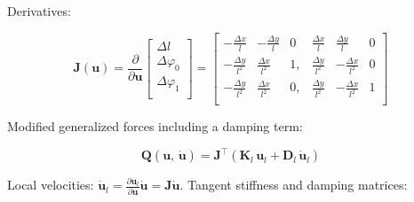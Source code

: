 Derivatives:

\begin{equation}
\renewcommand\arraystretch{1.5}
\boldsymbol{J}(\boldsymbol{u}) =
\frac{\partial}{\partial\boldsymbol{u}}
\begin{bmatrix}
\Delta l \\
\Delta \varphi_0 \\
\Delta \varphi_1 \\
\end{bmatrix}
=
\begin{bmatrix}
-\frac{\Delta x}{l} & -\frac{\Delta y}{l} & 0 & \frac{\Delta x}{l} & \frac{\Delta y}{l} & 0 \\
-\frac{\Delta y}{l^2} & \frac{\Delta x}{l^2} & 1, & \frac{\Delta y}{l^2} & -\frac{\Delta x}{l^2} & 0 \\
-\frac{\Delta y}{l^2} & \frac{\Delta x}{l^2} & 0, & \frac{\Delta y}{l^2} & -\frac{\Delta x}{l^2} & 1 \\
\end{bmatrix}
\end{equation}

Modified generalized forces including a damping term:

\begin{equation}
\boldsymbol{Q}(\boldsymbol{u},\,\dot{\boldsymbol{u}}) = \boldsymbol{J}^\intercal\left(\boldsymbol{K}_{l}\,\boldsymbol{u}_{l} + \boldsymbol{D}_{l}\,\dot{\boldsymbol{u}}_{l}\right)
\end{equation}

Local velocities: $\dot{\boldsymbol{u}}_{l} = \frac{\partial\boldsymbol{u}_l}{\partial\boldsymbol{u}}\dot{\boldsymbol{u}} = \boldsymbol{J}\dot{\boldsymbol{u}}$. Tangent stiffness and damping matrices:

